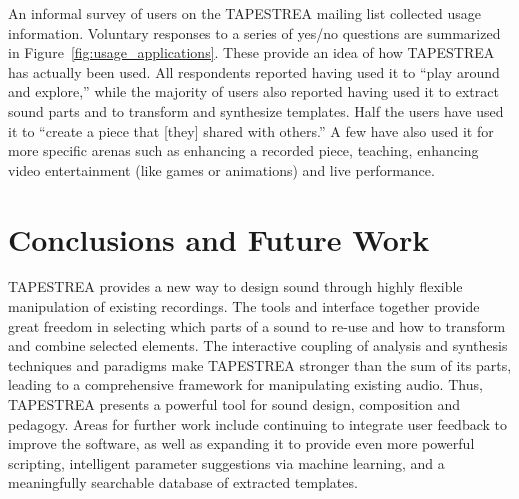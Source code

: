 \documentclass{sig-alt-release2}
\begin{document}
An informal survey of users on the TAPESTREA mailing list collected usage information. Voluntary responses to a series of yes/no questions are summarized in Figure~\ref{fig:usage_applications}. These provide an idea of how TAPESTREA has actually been used. All respondents reported having used it to ``play around and explore,'' while the majority of users also reported having used it to extract sound parts and to transform and synthesize templates. Half the users have used it to ``create a piece that [they] shared with others.'' A few have also used it for more specific arenas such as enhancing a recorded piece, teaching, enhancing video entertainment (like games or animations) and live performance. 

\section{Conclusions and Future Work}

TAPESTREA provides a new way to design sound through highly flexible manipulation of existing recordings. The tools and interface together provide great freedom in selecting which parts of a sound to re-use and how to transform and combine selected elements. The interactive coupling of analysis and synthesis techniques and paradigms make TAPESTREA stronger than the sum of its parts, leading to a comprehensive framework for manipulating existing audio. Thus, TAPESTREA presents a powerful tool for sound design, composition and pedagogy. Areas for further work include continuing to integrate user feedback to improve the software, as well as expanding it to provide even more powerful scripting, intelligent parameter suggestions via machine learning, and a meaningfully searchable database of extracted templates.

\end{document}
